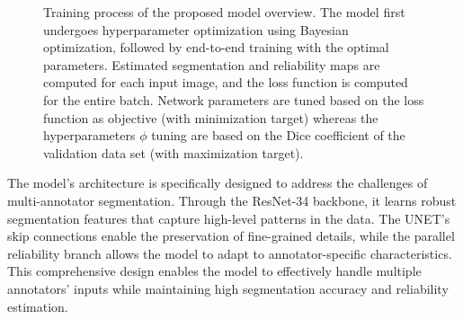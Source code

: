 \begin{figure}[h]
\begin{tikzpicture}
  \end{tikzpicture}
  \caption{Training process of the proposed model overview. The model first
    undergoes hyperparameter optimization using Bayesian optimization,
    followed by end-to-end training with the optimal parameters.
    Estimated segmentation and reliability maps are computed for each input
    image, and the loss function is computed for the entire batch.
    Network parameters are tuned based on the loss function as
    objective (with minimization target) whereas the hyperparameters
    $\phi$ tuning are based on the Dice coefficient of the validation
  data set (with maximization target). }
  \label{fig:optimization_process}
\end{figure}

The model's architecture is specifically designed to address the
challenges of multi-annotator segmentation. Through the ResNet-34
backbone, it learns robust segmentation features that capture
high-level patterns in the data. The UNET's skip connections enable
the preservation of fine-grained details, while the parallel
reliability branch allows the model to adapt to annotator-specific
characteristics. This comprehensive design enables the model to
effectively handle multiple annotators' inputs while maintaining high
segmentation accuracy and reliability estimation.
